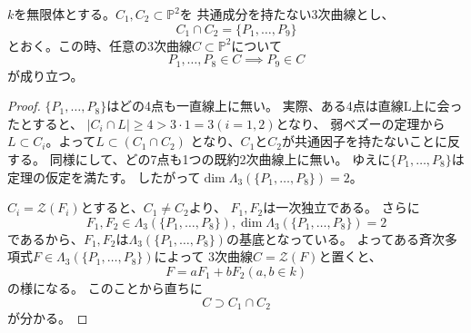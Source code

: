 \documentclass[a4]{article}
\newcommand{\proj}{\mathbb{P}}
\begin{document}
        \begin{Coll} \label{coll401}
            $k$を無限体とする。$C_1, C_2 \subset \proj^2$を
            共通成分を持たない3次曲線とし、
             \[ C_1 \cap C_2 = \{ P_1, \dots, P_9 \} \]
             とおく。この時、任意の3次曲線$C \subset \proj^2$について
             \[ P_1, \dots, P_8 \in C \implies P_9 \in C \]
             が成り立つ。
        \end{Coll}
        \begin{proof}
        $\{ P_1, \dots, P_8 \}$はどの4点も一直線上に無い。
        実際、ある4点は直線L上に会ったとすると、
        $|C_i \cap L| \geq 4 > 3 \cdot 1=3$$(i=1,2)$となり、
        弱ベズーの定理から$L \subset C_i$。よって$L \subset (C_1 \cap C_2)$
        となり、$C_1$と$C_2$が共通因子を持たないことに反する。
        同様にして、どの7点も1つの既約2次曲線上に無い。
        ゆえに$\{ P_1, \dots, P_8\}$は定理の仮定を満たす。
        したがって$\dim \Lambda_3(\{ P_1, \dots, P_8\})=2$。

        $C_i=\mathcal{Z}(F_i)$とすると、$C_1 \neq C_2$より、
        $F_1, F_2$は一次独立である。
        さらに
        \[ F_1, F_2 \in \Lambda_3(\{ P_1, \dots, P_8\}), \dim \Lambda_3(\{ P_1, \dots, P_8\})=2 \]
        であるから、$F_1, F_2$は$\Lambda_3(\{ P_1, \dots, P_8\})$の基底となっている。
        よってある斉次多項式$F \in \Lambda_3(\{ P_1, \dots, P_8\})$によって
        3次曲線$C=\mathcal{Z}(F)$と置くと、\[ F=aF_1+bF_2(a,b \in k) \]の様になる。
        このことから直ちに\[ C \supset C_1 \cap C_2 \]が分かる。
        \end{proof}
\end{document}
